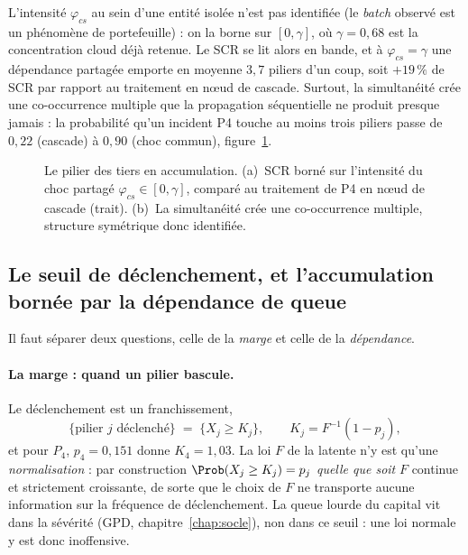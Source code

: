 L'intensité $\varphi_{cs}$ au sein d'une entité isolée n'est pas identifiée (le \emph{batch}
observé est un phénomène de portefeuille) : on la borne sur $[0,\gamma]$, où $\gamma=0{,}68$
est la concentration cloud déjà retenue. Le SCR se lit alors en bande, et à
$\varphi_{cs}=\gamma$ une dépendance partagée emporte en moyenne $3{,}7$ piliers d'un coup,
soit $+19\,\%$ de SCR par rapport au traitement en n\oe{}ud de cascade. Surtout, la
simultanéité crée une co-occurrence multiple que la propagation séquentielle ne produit
presque jamais : la probabilité qu'un incident P4 touche au moins trois piliers passe de
$0{,}22$ (cascade) à $0{,}90$ (choc commun), figure~\ref{fig:p4}.

\begin{figure}[htbp]\centering
{}
\caption{Le pilier des tiers en accumulation. (a)~SCR borné sur l'intensité du choc partagé
$\varphi_{cs}\in[0,\gamma]$, comparé au traitement de P4 en n\oe{}ud de cascade (trait).
(b)~La simultanéité crée une co-occurrence multiple, structure symétrique donc identifiée.
}
\label{fig:p4}
\end{figure}

\subsection{Le seuil de déclenchement, et l'accumulation bornée par la dépendance de queue}
\label{sec:p4-seuil}

Il faut séparer deux questions, celle de la \emph{marge} et celle de la \emph{dépendance}.

\paragraph{La marge : quand un pilier bascule.} Le déclenchement est un franchissement,
\begin{equation}
  \{\text{pilier } j \text{ déclenché}\} \;=\; \{X_j \ge K_j\},
  \qquad K_j = F^{-1}(1-p_j),
  \label{eq:seuil-Kj}
\end{equation}
et pour $P_4$, $p_4=0{,}151$ donne $K_4=1{,}03$. La loi $F$ de la latente n'y est qu'une
\emph{normalisation} : par construction $\Prob(X_j\ge K_j)=p_j$ \emph{quelle que soit} $F$
continue et strictement croissante, de sorte que le choix de $F$ ne transporte aucune information
sur la fréquence de déclenchement. La queue lourde du capital vit dans la sévérité (GPD,
chapitre~\ref{chap:socle}), non dans ce seuil : une loi normale y est donc inoffensive.

